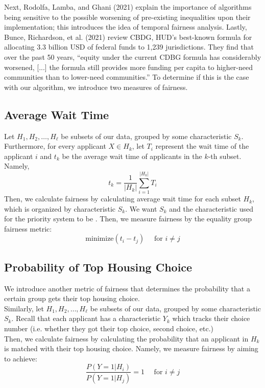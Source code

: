 \documentclass[11pt]{article}
\begin{document}
Next, Rodolfa, Lamba, and Ghani (2021) explain the importance of algorithms being sensitive to
the possible worsening of pre-existing inequalities upon their implementation; this introduces the idea of temporal fairness analysis. Lastly, Bunce, Richardson, et al. (2021) review CBDG,
HUD's best-known formula for allocating 3.3 billion USD of federal funds to 1,239 jurisdictions. They find that over the past 50 years, “equity under the current CDBG formula has considerably worsened, [...] the formula still provides more funding per capita to higher-need communities than to lower-need communities.” To determine if this is the case with our algorithm, we introduce two measures of fairness.

\subsection{Average Wait Time}

Let $H_1, H_2, \dots, H_\ell$ be subsets of our data, grouped by some characteristic $S_k$. Furthermore, for every applicant $X \in H_k$, let $T_i$ represent the wait time of the applicant $i$ and $t_k$ be the average wait time of applicants in the $k$-th subset. Namely,
\[t_k = \frac{1}{|H_k|}\sum_{i=1}^{|H_k|}T_i\]
Then, we calculate fairness by calculating average wait time for each subset $H_k$, which is organized by characteristic $S_k$. We want $S_k$ and the characteristic used for the priority system to be . Then, we measure fairness by the equality group fairness metric:
\[\text{minimize}(t_i - t_j) \quad \text{ for } i \neq j\]
\subsection{Probability of Top Housing Choice}
We introduce another metric of fairness that determines the probability that a certain group gets their top housing choice. \\
\newline
Similarly, let $H_1, H_2, \dots, H_\ell$ be subsets of our data, grouped by some characteristic $S_k$. Recall that each applicant has a characteristic $Y_k$ which tracks their choice number (i.e. whether they got their top choice, second choice, etc.) \\
\newline
Then, we calculate fairness by calculating the probability that an applicant in $H_k$ is matched with their top housing choice. Namely, we measure fairness by aiming to achieve:
\[\frac{P(Y = 1 | H_i)}{P(Y = 1 | H_j)} = 1 \quad \text{ for } i \neq j\]
\end{document}

